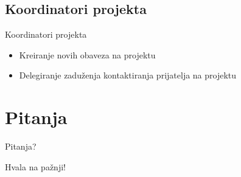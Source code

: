 \documentclass[xcolor={dvipsnames}, 11pt]{beamer}
\begin{document}
\subsection{Koordinatori projekta}
\begin{frame}{Koordinatori projekta}
	\begin{itemize}
		\item Kreiranje novih obaveza na projektu
		\item Delegiranje zadu\v zenja kontaktiranja prijatelja na projektu
	\end{itemize}
\end{frame}

\section{Pitanja}
\begin{frame}
	Pitanja?
\end{frame}

\begin{frame}
	Hvala na pa\v znji!
\end{frame}
	
	
\end{document}

